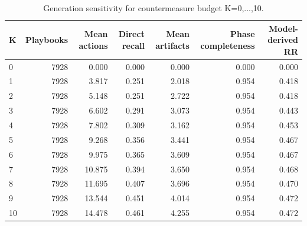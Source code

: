 \begin{table}[tb]
\centering
\caption{Generation sensitivity for countermeasure budget K=0,...,10.}
\label{tab:corrected_generation_k_sensitivity}
\begin{tabular}{lrrrrrr}
\toprule
K & Playbooks & Mean actions & Direct recall & Mean artifacts & Phase completeness & Model-derived RR \\
\midrule
0 & 7928 & 0.000 & 0.000 & 0.000 & 0.000 & 0.000 \\
1 & 7928 & 3.817 & 0.251 & 2.018 & 0.954 & 0.418 \\
2 & 7928 & 5.148 & 0.251 & 2.722 & 0.954 & 0.418 \\
3 & 7928 & 6.602 & 0.291 & 3.073 & 0.954 & 0.443 \\
4 & 7928 & 7.802 & 0.309 & 3.162 & 0.954 & 0.453 \\
5 & 7928 & 9.268 & 0.356 & 3.441 & 0.954 & 0.467 \\
6 & 7928 & 9.975 & 0.365 & 3.609 & 0.954 & 0.467 \\
7 & 7928 & 10.875 & 0.394 & 3.650 & 0.954 & 0.468 \\
8 & 7928 & 11.695 & 0.407 & 3.696 & 0.954 & 0.470 \\
9 & 7928 & 13.544 & 0.451 & 4.014 & 0.954 & 0.472 \\
10 & 7928 & 14.478 & 0.461 & 4.255 & 0.954 & 0.472 \\
\bottomrule
\end{tabular}
\end{table}
